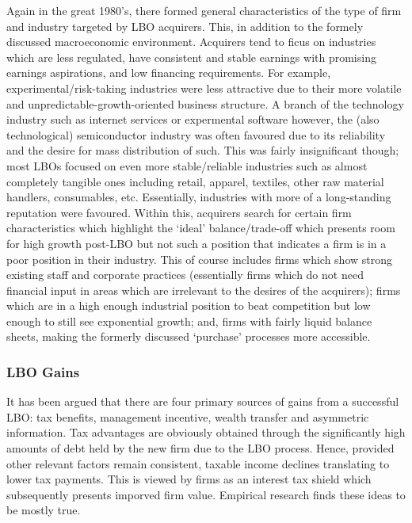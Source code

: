 \documentclass[11pt, english]{article}
\begin{document}
	Again in the great 1980's, there formed general characteristics of the type of firm and industry targeted by LBO acquirers. This, in addition to the formely discussed macroeconomic environment. Acquirers tend to ficus on industries which are less regulated, have consistent and stable earnings with promising earnings aspirations, and low financing requirements. For example, experimental/risk-taking industries were less attractive due to their more volatile and unpredictable-growth-oriented business structure. A branch of the technology industry such as internet services or expermental software however, the (also technological) semiconductor industry was often favoured due to its reliability and the desire for mass distribution of such. This was fairly insignificant though; most LBOs focused on even more stable/reliable industries such as almost completely tangible ones including retail, apparel, textiles, other raw material handlers, consumables, etc. Essentially, industries with more of a long-standing reputation were favoured. Within this, acquirers search for certain firm characteristics which highlight the `ideal' balance/trade-off which presents room for high growth post-LBO but not such a position that indicates a firm is in a poor position in their industry. This of course includes firms which show strong existing staff and corporate practices (essentially firms which do not need financial input in areas which are irrelevant to the desires of the acquirers); firms which are in a high enough industrial position to beat competition but low enough to still see exponential growth; and, firms with fairly liquid balance sheets, making the formerly discussed `purchase' processes more accessible.

		\subsubsection*{LBO Gains}

	It has been argued that there are four primary sources of gains from a successful LBO: tax benefits, management incentive, wealth transfer and asymmetric information. Tax advantages are obviously obtained through the significantly high amounts of debt held by the new firm due to the LBO process. Hence, provided other relevant factors remain consistent, taxable income declines translating to lower tax payments. This is viewed by firms as an interest tax shield which subsequently presents imporved firm value. Empirical research finds these ideas to be mostly true.\\
\end{document}
